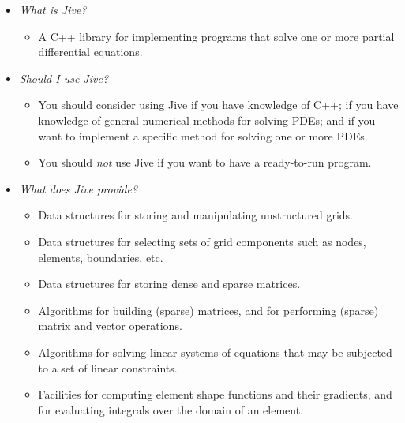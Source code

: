 \documentclass[a4paper,12pt]{article}
\begin{document}
\begin{itemize}

\item \emph{What is Jive?}

  \begin{itemize}
    
  \item A C++ library for implementing programs that solve one or more
    partial differential equations.
  
  \end{itemize}


\item \emph{Should I use Jive?}

  \begin{itemize}
    
  \item You should consider using Jive if you have knowledge of C++;
    if you have knowledge of general numerical methods for solving
    PDEs; and if you want to implement a specific method for solving
    one or more PDEs.

  \item You should \emph{not} use Jive if you want to have a
    ready-to-run program.

  \end{itemize}


\item \emph{What does Jive provide?}

  \begin{itemize}
    
  \item Data structures for storing and manipulating unstructured
    grids.

  \item Data structures for selecting sets of grid components such as
    nodes, elements, boundaries, etc.

  \item Data structures for storing dense and sparse matrices.
    
  \item Algorithms for building (sparse) matrices, and for performing
    (sparse) matrix and vector operations.

  \item Algorithms for solving linear systems of equations that may be
    subjected to a set of linear constraints.
    
  \item Facilities for computing element shape functions and their
    gradients, and for evaluating integrals over the domain of an
    element.
    

\end{itemize}
\end{itemize}
\end{document}
